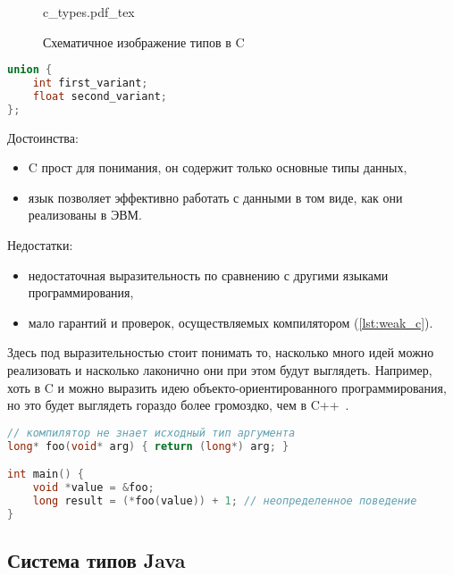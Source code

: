 \begin{figure}[H]
    \centering
    {c_types.pdf_tex}
    \caption{Схематичное изображение типов в C}
    \label{fig:c_types}
\end{figure}

\begin{lstlisting}[label={lst:union},language=C,caption={Объявление безымянного объединения в языке C. В одной переменной твкого типа может содержаться либо целое число, либо вещественное.}]
union {
    int first_variant;
    float second_variant;
};
\end{lstlisting}

Достоинства:
\begin{itemize}
    \item C прост для понимания, он содержит только основные типы данных,
    \item язык позволяет эффективно работать с данными в том виде, как они реализованы в ЭВМ.
\end{itemize}

Недостатки:
\begin{itemize}
    \item недостаточная выразительность по сравнению с другими языками программирования,
    \item мало гарантий и проверок, осуществляемых компилятором (\ref{lst:weak_c}).
\end{itemize}

Здесь под выразительностью стоит понимать то, насколько много идей можно реализовать и насколько лаконично они при этом будут выглядеть.
Например, хоть в C и можно выразить идею объекто-ориентированного программирования, но это будет выглядеть гораздо более громоздко, чем в C++~\cite{OOP_in_C}.

\begin{lstlisting}[label={lst:weak_c},language=C,caption={Неправильное использование \lstinline{void*} не может быть отслежено компилятором}]
// компилятор не знает исходный тип аргумента
long* foo(void* arg) { return (long*) arg; }

int main() {
    void *value = &foo;
    long result = (*foo(value)) + 1; // неопределенное поведениe
}
\end{lstlisting}

\subsection{Система типов Java}
\label{subsec:java_type_system}

